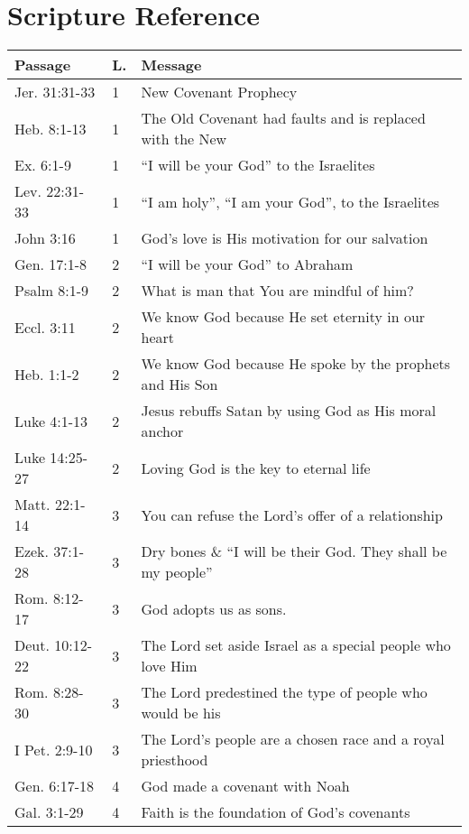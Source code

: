 \chapter{Scripture Reference}

\begin{table}[h]%
\centering
\begin{tabular}{llp{11cm}}
\toprule
Passage & L. & Message \\
\midrule
Jer. 31:31-33  & 1 & New Covenant Prophecy\\
Heb. 8:1-13    & 1 & The Old Covenant had faults and is replaced with the New\\
Ex. 6:1-9      & 1 & ``I will be your God'' to the Israelites\\
Lev. 22:31-33  & 1 & ``I am holy'', ``I am your God'', to the Israelites\\
John 3:16      & 1 & God's love is His motivation for our salvation\\
Gen. 17:1-8    & 2 & ``I will be your God'' to Abraham\\
Psalm 8:1-9    & 2 & What is man that You are mindful of him?\\
Eccl. 3:11     & 2 & We know God because He set eternity in our heart\\
Heb. 1:1-2     & 2 & We know God because He spoke by the prophets and His Son\\
Luke 4:1-13    & 2 & Jesus rebuffs Satan by using God as His moral anchor\\
Luke 14:25-27  & 2 & Loving God is the key to eternal life\\
Matt. 22:1-14  & 3 & You can refuse the Lord's offer of a relationship\\
Ezek. 37:1-28  & 3 & Dry bones \& ``I will be their God.  They shall be my people''\\
Rom. 8:12-17   & 3 & God adopts us as sons.\\
Deut. 10:12-22 & 3 & The Lord set aside Israel as a special people who love Him\\
Rom. 8:28-30   & 3 & The Lord predestined the type of people who would be his\\
I Pet. 2:9-10  & 3 & The Lord's people are a chosen race and a royal priesthood\\
Gen. 6:17-18   & 4 & God made a covenant with Noah \\
Gal. 3:1-29    & 4 & Faith is the foundation of God's covenants\\
\bottomrule
\end{tabular}
\label{tab:ScriptureReference}
\end{table}
